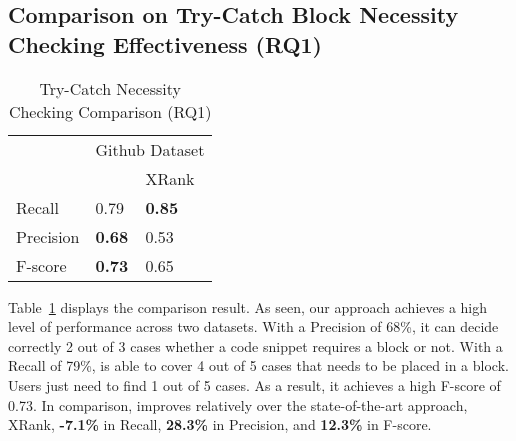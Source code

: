 \subsection{Comparison on Try-Catch Block Necessity Checking Effectiveness (RQ1)}
\label{sec:rq1}

\begin{table}[t]%
  \caption{Try-Catch Necessity Checking Comparison (RQ1)}
  \vspace{-12pt}
  \small
	\begin{center}
		\renewcommand{\arraystretch}{1}
		\begin{tabular}{|p{1.75cm}<{\centering}|p{1.75cm}<{\centering}|p{1.75cm}<{\centering}|}
		  \hline
			\multirow{2}{*}{} & \multicolumn{2}{c|}{Github Dataset} \\
			\cline{2-3}
			  & \tool  & XRank~\cite{xrank-fse20} \\
			\hline
			Recall    & 0.79 & \textbf{0.85}\\
			Precision & \textbf{0.68} & 0.53\\
			F-score   & \textbf{0.73} & 0.65\\
			\hline
		\end{tabular}
		\label{tab:xblock}
	\end{center}
\end{table}


Table~\ref{tab:xblock} displays the comparison result. As seen, our
approach achieves a high level of performance across two
datasets. With a Precision of 68\%, it can decide correctly 2 out of 3
cases whether a code snippet requires a  block or
not. With a Recall of 79\%, {\tool} is able to cover 4 out of 5 cases
that needs to be placed in a  block. Users just need
to find 1 out of 5 cases. As a result, it achieves a high F-score of
0.73.
In comparison, {\tool} improves relatively over the state-of-the-art
approach, XRank, {\bf -7.1\%} in Recall, {\bf 28.3\%} in Precision, and
{\bf 12.3\%} in F-score.


